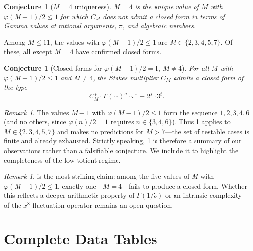 \documentclass[12pt,a4paper]{article}
\numberwithin{equation}{section}
\theoremstyle{plain}
\newtheorem{conjecture}[theorem]{Conjecture}
\theoremstyle{definition}
\theoremstyle{remark}
\newtheorem{remark}[theorem]{Remark}
\begin{document}
\begin{conjecture}[$M = 4$ uniqueness]\label{conj:M4}
$M = 4$ is the unique value of $M$ with $\varphi(M{-}1)/2 \le 1$ for which $C_M$
does not admit a closed form in terms of Gamma values at rational arguments,
$\pi$, and algebraic numbers.
\end{conjecture}

Among $M \le 11$, the values with $\varphi(M{-}1)/2 \le 1$ are
$M \in \{2, 3, 4, 5, 7\}$. Of these, all except $M = 4$ have confirmed
closed forms.

\begin{conjecture}[Closed forms for $\varphi(M{-}1)/2 = 1$, $M \ne 4$]\label{conj:phi1}
For all $M$ with $\varphi(M{-}1)/2 \le 1$ and $M \ne 4$, the Stokes
multiplier $C_M$ admits a closed form of the type
\begin{equation}
  C_M^{\,p}\cdot\Gamma(\cdots)^q\cdot\pi^r = 2^s\cdot 3^t.
\end{equation}
\end{conjecture}

\begin{remark}
The values $M{-}1$ with $\varphi(M{-}1)/2 \le 1$ form the sequence
$1, 2, 3, 4, 6$ (and no others, since $\varphi(n)/2 = 1$ requires
$n \in \{3, 4, 6\}$). Thus \cref{conj:phi1} applies to
$M \in \{2, 3, 4, 5, 7\}$ and makes no predictions for $M > 7$---the set
of testable cases is finite and already exhausted. Strictly speaking,
\cref{conj:phi1} is therefore a summary of our observations rather than
a falsifiable conjecture. We include it to highlight the completeness of
the low-totient regime.
\end{remark}

\begin{remark}
 is the most striking claim: among the five values of $M$
with $\varphi(M{-}1)/2 \le 1$, exactly one---$M = 4$---fails to produce a
closed form. Whether this reflects a deeper arithmetic property of
$\Gamma(1/3)$ or an intrinsic complexity of the $x^8$ fluctuation
operator remains an open question.
\end{remark}

\section{Complete Data Tables}
\label{sec:tables}
\end{document}
